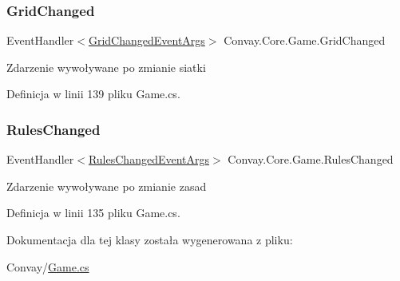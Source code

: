 \subsubsection{\texorpdfstring{Grid\+Changed}{GridChanged}}
{\footnotesize\ttfamily Event\+Handler$<$\hyperlink{class_convay_1_1_core_1_1_grid_changed_event_args}{Grid\+Changed\+Event\+Args}$>$ Convay.\+Core.\+Game.\+Grid\+Changed}



Zdarzenie wywoływane po zmianie siatki 



Definicja w linii 139 pliku Game.\+cs.

\hypertarget{class_convay_1_1_core_1_1_game_a505038e37e1687fafcf5f304254e18db}{}\label{class_convay_1_1_core_1_1_game_a505038e37e1687fafcf5f304254e18db} 
\subsubsection{\texorpdfstring{Rules\+Changed}{RulesChanged}}
{\footnotesize\ttfamily Event\+Handler$<$\hyperlink{class_convay_1_1_core_1_1_rules_changed_event_args}{Rules\+Changed\+Event\+Args}$>$ Convay.\+Core.\+Game.\+Rules\+Changed}



Zdarzenie wywoływane po zmianie zasad 



Definicja w linii 135 pliku Game.\+cs.



Dokumentacja dla tej klasy została wygenerowana z pliku\+:\begin{DoxyCompactItemize}
\item 
Convay/\hyperlink{_game_8cs}{Game.\+cs}\end{DoxyCompactItemize}
